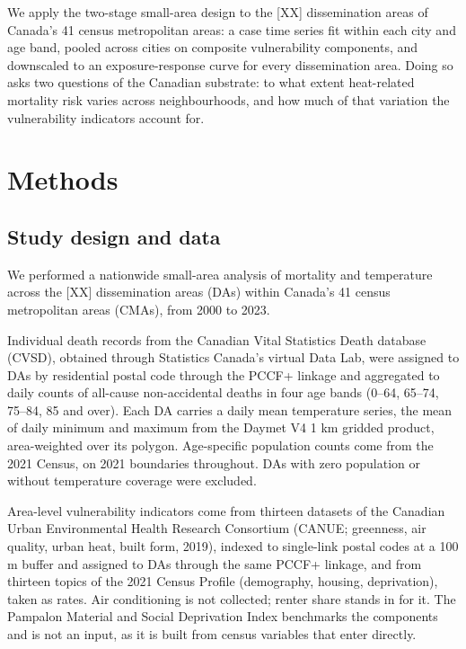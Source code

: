 \documentclass[12pt]{article}
\begin{document}
We apply the two-stage small-area design
\citep{gasparrini2022smallarea} to the [XX] dissemination areas
of Canada's 41 census metropolitan areas: a case time series fit
within each city and age band, pooled across cities on composite
vulnerability components, and downscaled to an exposure-response
curve for every dissemination area. Doing so asks two questions
of the Canadian substrate: to what extent heat-related mortality
risk varies across neighbourhoods, and how much of that
variation the vulnerability indicators account for.

\section{Methods} %

\subsection{Study design and data}

We performed a nationwide small-area analysis of mortality and
temperature across the [XX] dissemination areas (DAs) within
Canada's 41 census metropolitan areas (CMAs), from 2000 to 2023.

Individual death records from the Canadian Vital Statistics
Death database (CVSD), obtained through Statistics Canada's
virtual Data Lab, were assigned to DAs by residential postal
code through the PCCF+ linkage and aggregated to daily counts of
all-cause non-accidental deaths in four age bands (0--64, 65--74,
75--84, 85 and over). Each DA carries a daily mean temperature
series, the mean of daily minimum and maximum from the Daymet V4
1 km gridded product, area-weighted over its polygon.
Age-specific population counts come from the 2021 Census, on
2021 boundaries throughout. DAs with zero population or without
temperature coverage were excluded.

Area-level vulnerability indicators come from thirteen datasets
of the Canadian Urban Environmental Health Research Consortium
(CANUE; greenness, air quality, urban heat, built form, 2019),
indexed to single-link postal codes at a 100 m buffer and
assigned to DAs through the same PCCF+ linkage, and from
thirteen topics of the 2021 Census Profile (demography, housing,
deprivation), taken as rates. Air conditioning is not collected;
renter share stands in for it. The Pampalon Material and Social
Deprivation Index benchmarks the components and is not an input,
as it is built from census variables that enter directly.
\end{document}
